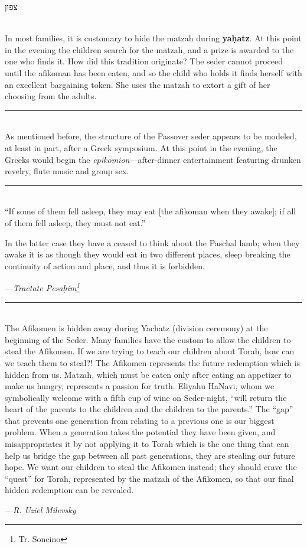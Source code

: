 \documentclass[a4paper,10pt,openany]{memoir}
\newcommand{\HgSource}[1]{\hfill{\small---\itshape{#1}}}
\newcommand{\hchapter}[1]{
  \begin{hebrew}
    \begin{Spacing}{.97}
      \newpage
      \strut

      \vspace{.15em}

      \begin{flushleft}
      \noindent\Huge #1
      \end{flushleft}

      \vspace{1em}
    \end{Spacing}
  \end{hebrew}
}
\newcommand{\HgFill}{\vfill \hrule \vfill}
\newenvironment{HgEnglish}{\strut\\\noindent}{\vspace{1em}}
\begin{document}
\vfill

\hchapter{צפון}

\begin{HgEnglish}
In most families, it is customary to hide the matzah during {\bfseries
ya\d{h}atz}. At this point in the evening the children search for the matzah,
and a prize is awarded to the one who finds it.
%
How did this tradition originate? The seder cannot proceed until
the afikoman has been eaten, and so the child who holds it finds herself with an
excellent bargaining token. She uses the matzah to extort a gift of her choosing
from the adults.
\end{HgEnglish}

\HgFill

\begin{HgEnglish}
  As mentioned before, the structure of the Passover seder appears to be
  modeled, at least in part, after a Greek symposium. At this point in the
  evening, the Greeks would begin the {\itshape epikomion}---after-dinner
  entertainment featuring drunken revelry, flute music and group sex.
\end{HgEnglish}

\HgFill

\begin{HgEnglish}
``If some of them fell asleep, they may eat [the afikoman when they awake]; if
all of them fell asleep, they must not eat.''

In the latter case they have a ceased to think about the Paschal lamb; when they
awake it is as though they would eat in two different places, sleep breaking the
continuity of action and place, and thus it is forbidden.

\HgSource{Tractate Pesa\d{h}im\footnote{Tr. Soncino}}\\
\end{HgEnglish}

\HgFill

\begin{HgEnglish}
The Afikomen is hidden away during Yachatz (division ceremony) at the beginning
of the Seder. Many families have the custom to allow the children to steal the
Afikomen. If we are trying to teach our children about Torah, how can we teach
them to steal?! The Afikomen represents the future redemption which is hidden
from us. Matzah, which must be eaten only after eating an appetizer to make us
hungry, represents a passion for truth. Eliyahu HaNavi, whom we symbolically
welcome with a fifth cup of wine on Seder-night, ``will return the heart of the
parents to the children and the children to the parents.'' The ``gap'' that
prevents one generation from relating to a previous one is our biggest problem.
When a generation takes the potential they have been given, and misappropriates
it by not applying it to Torah which is the one thing that can help us bridge
the gap between all past generations, they are stealing our future hope. We want
our children to steal the Afikomen instead; they should crave the ``quest'' for
Torah, represented by the matzah of the Afikomen, so that our final hidden
redemption can be revealed. 

\HgSource{R. Uziel Milevsky}
\end{HgEnglish}
\end{document}
